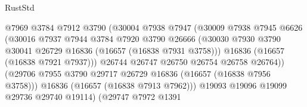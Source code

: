 \begin{lexlean}{RustStd}
\begin{coremodule}
                                        @7969
                                        @3784
                                        @7912
                                        @3790
                                        (@30004
                                          @7938
                                          @7947
                                          (@30009
                                            @7938
                                            @7945
                                            @6626
                                            (@30016
                                              @7937
                                              @7944
                                              @3784
                                              @7920
                                              @3790
                                              @26666
                                              (@30030
                                                @7930
                                                @3790
                                                @30041
                                                @26729
                                                @16836
                                                (@16657 (@16838 @7931 @3758)))
                                              @16836
                                              (@16657 (@16838 @7921 @7937)))
                                            @26744
                                            @26747
                                            @26750
                                            @26754
                                            @26758
                                            @26764))
                                        (@29706
                                          @7955
                                          @3790
                                          @29717
                                          @26729
                                          @16836
                                          (@16657 (@16838 @7956 @3758)))
                                        @16836
                                        (@16657 (@16838 @7913 @7962)))
                                      @19093
                                      @19096
                                      @19099
                                      @29736
                                      @29740
                                      @19114)
                                    (@29747
                                      @7972
                                      @1391

\end{coremodule}
\end{lexlean}
